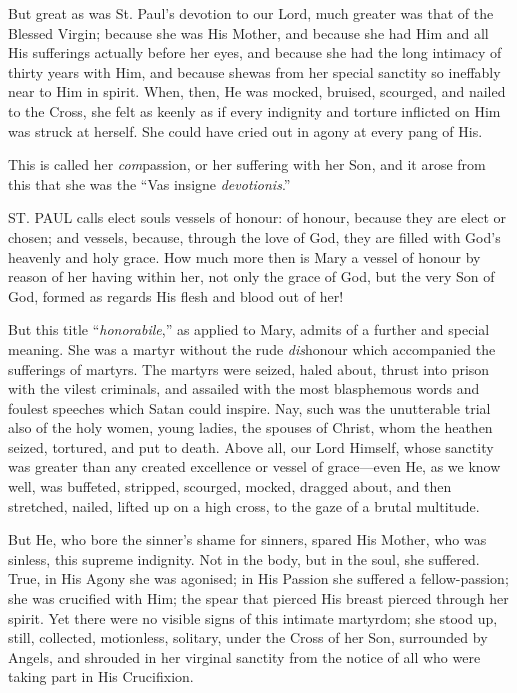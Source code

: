 But great as was St. Paul's
devotion to our Lord, much greater was that of the Blessed Virgin;
because she was His Mother, and because she had Him and all His
sufferings actually before her eyes, and because she had the long
intimacy of thirty years with Him, and because she\emph{}was from her
special sanctity so ineffably near to Him in spirit. When, then, He was
mocked, bruised, scourged, and nailed to the Cross, she felt as keenly
as if every indignity and torture inflicted on Him was struck at
herself. She could have cried out in agony at every pang of His.

This is called her \emph{com}passion,
or her suffering with her Son, and it arose from this that she was the ``Vas
insigne \emph{devotionis}.''



ST.
PAUL
calls elect souls vessels of honour: of honour, because they are elect
or chosen; and vessels, because, through the love of God, they are
filled with God's heavenly and holy grace. How much more then is Mary a
vessel of honour by reason of her having within her, not only the grace
of God, but the very Son of God, formed as regards His flesh and blood
out of her!

But this title ``\emph{honorabile},''
as applied to Mary, admits of a further and special meaning. She was a
martyr without the rude \emph{dis}honour which accompanied the
sufferings of martyrs. The martyrs were seized, haled about, thrust into
prison with the vilest criminals, and assailed with the most blasphemous
words and foulest speeches which Satan could inspire. Nay, such was the
unutterable trial also of the holy women, young ladies, the spouses of
Christ, whom the heathen seized, tortured, and put to death. Above all,
our Lord Himself, whose sanctity was greater than any created
excellence or vessel of grace—even He, as we know well, was buffeted,
stripped, scourged, mocked, dragged about, and then stretched, nailed,
lifted up on a high cross, to the gaze of a brutal multitude.

But He, who bore the sinner's
shame for sinners, spared His Mother, who was sinless, this supreme
indignity. Not in the body, but in the soul, she suffered. True, in His
Agony she was agonised; in His Passion she suffered a fellow-passion;
she was crucified with Him; the spear that pierced His breast pierced
through her spirit. Yet there were no visible signs of this intimate
martyrdom; she stood up, still, collected, motionless, solitary, under
the Cross of her Son, surrounded by Angels, and shrouded in her virginal
sanctity from the notice of all who were taking part in His Crucifixion.

